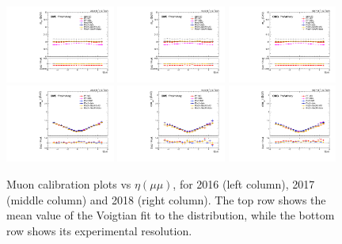 \begin{figure}[!htb]
      \centering
      \includegraphics[width=0.32\textwidth]{pics/muon_corr/muon_cal/2016/dimu_eta_summary_mean.pdf}
      \includegraphics[width=0.32\textwidth]{pics/muon_corr/muon_cal/2017/dimu_eta_summary_mean.pdf}
      \includegraphics[width=0.32\textwidth]{pics/muon_corr/muon_cal/2018/dimu_eta_summary_mean.pdf}
      \includegraphics[width=0.32\textwidth]{pics/muon_corr/muon_cal/2016/dimu_eta_summary_reso.pdf}
      \includegraphics[width=0.32\textwidth]{pics/muon_corr/muon_cal/2017/dimu_eta_summary_reso.pdf}
      \includegraphics[width=0.32\textwidth]{pics/muon_corr/muon_cal/2018/dimu_eta_summary_reso.pdf}
      \caption{Muon calibration plots vs $\eta(\mu\mu)$, for 2016 (left column), 2017 (middle column) and 2018 (right column).
               The top row shows the mean value of the Voigtian fit to the \mmm distribution, 
               while the bottom row shows its experimental resolution.}
      \label{fig:mucal_dimu_eta}
\end{figure}


